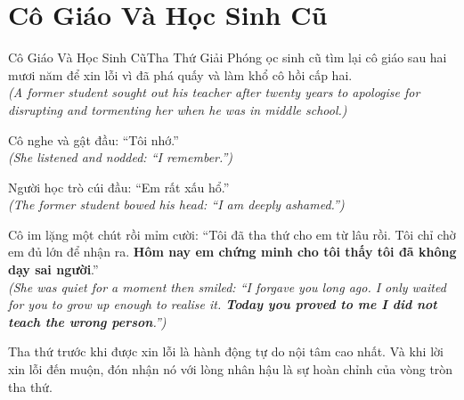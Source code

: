 \section{Cô Giáo Và Học Sinh Cũ}
\begin{truyen}{Cô Giáo Và Học Sinh Cũ}{Tha Thứ Giải Phóng}
ọc sinh cũ tìm lại cô giáo sau hai mươi năm để xin lỗi vì đã phá quấy và làm khổ cô hồi cấp hai.\\
\textit{(A former student sought out his teacher after twenty years to apologise for disrupting and tormenting her when he was in middle school.)}

Cô nghe và gật đầu: ``Tôi nhớ.''\\
\textit{(She listened and nodded: ``I remember.'')}

Người học trò cúi đầu: ``Em rất xấu hổ.''\\
\textit{(The former student bowed his head: ``I am deeply ashamed.'')}

Cô im lặng một chút rồi mỉm cười: ``Tôi đã tha thứ cho em từ lâu rồi. Tôi chỉ chờ em đủ lớn để nhận ra. \textbf{Hôm nay em chứng minh cho tôi thấy tôi đã không dạy sai người}.''\\
\textit{(She was quiet for a moment then smiled: ``I forgave you long ago. I only waited for you to grow up enough to realise it. \textbf{Today you proved to me I did not teach the wrong person}.'')}
\end{truyen}
\begin{baihoc}
  Tha thứ trước khi được xin lỗi là hành động tự do nội tâm cao nhất. Và khi lời xin lỗi đến muộn, đón nhận nó với lòng nhân hậu là sự hoàn chỉnh của vòng tròn tha thứ.
\end{baihoc}

